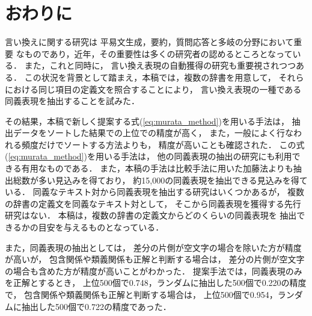\section{おわりに}

言い換えに関する研究\cite{sato_ronbun_iikae,inui_iikae_tutorial,murata_paraphrase_nlp2004}は
平易文生成，要約，質問応答\cite{murata2000_1_nl,murata_qa_ieice_kaisetu}と多岐の分野において重要
なものであり，近年，その重要性は多くの研究者の認めるところとなっている．
また，これと同時に，
言い換え表現の自動獲得の研究も重要視されつつある．
この状況を背景として踏まえ，本稿では，複数の辞書を用意して，
それらにおける同じ項目の定義文を照合することにより，
言い換え表現の一種である同義表現を抽出することを試みた．

その結果，本稿で新しく提案する式(\ref{eq:murata_method})を用いる手法は，
抽出データをソートした結果での上位での精度が高く，
また，一般によく行なわれる頻度だけでソートする方法よりも，
精度が高いことも確認された．
この式(\ref{eq:murata_method})を用いる手法は，
他の同義表現の抽出の研究にも利用できる有用なものである．
また，本稿の手法は比較手法に用いた加藤法よりも抽出総数が多い見込みを得ており，
約15,000の同義表現を抽出できる見込みを得ている．
同義なテキスト対から同義表現を抽出する研究はいくつかあるが，
複数の辞書の定義文を同義なテキスト対として，
そこから同義表現を獲得する先行研究はない．
本稿は，複数の辞書の定義文からどのくらいの同義表現を
抽出できるかの目安を与えるものとなっている．

また，同義表現の抽出としては，
差分の片側が空文字の場合を除いた方が精度が高いが，
包含関係や類義関係も正解と判断する場合は，
差分の片側が空文字の場合も含めた方が精度が高いことがわかった．
提案手法では，同義表現のみを正解とするとき，
上位500個で0.748，ランダムに抽出した500個で0.220の精度で，
包含関係や類義関係も正解と判断する場合は，
上位500個で0.954，ランダムに抽出した500個で0.722の精度であった．


